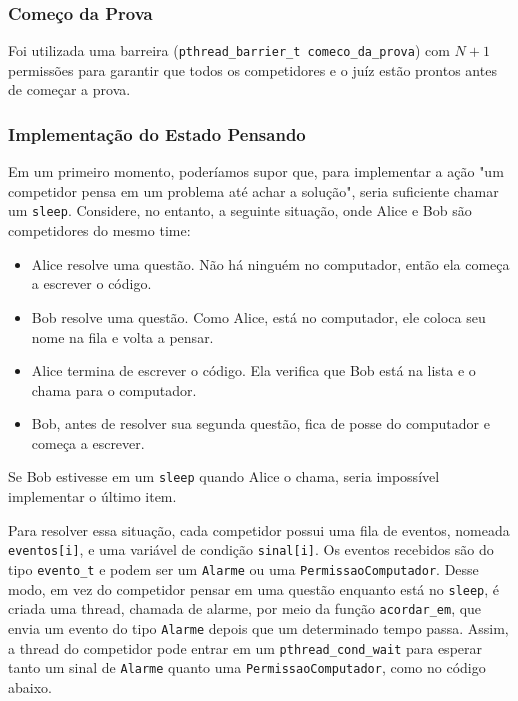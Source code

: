 \documentclass[11pt]{article}
\newcommand{\code}{\lstinline[mathescape=true]}
\begin{document}
\subsubsection{Começo da Prova}
Foi utilizada uma barreira (\code{pthread_barrier_t comeco_da_prova}) com $N + 1$ permissões para garantir que todos os competidores e o juíz
estão prontos antes de começar a prova.

\subsubsection{Implementação do Estado Pensando}
Em um primeiro momento, poderíamos supor que, para implementar a ação "um competidor pensa em um
problema até achar a solução", seria suficiente chamar um \code{sleep}. Considere, no entanto, a
seguinte situação, onde Alice e Bob são competidores do mesmo time:

\begin{itemize}
	\item Alice resolve uma questão. Não há ninguém no computador, então ela começa a escrever o
		código.
	\item Bob resolve uma questão. Como Alice, está no computador, ele coloca seu nome na fila e
		volta a pensar.
	\item Alice termina de escrever o código. Ela verifica que Bob está na lista e o chama para o
		computador.
	\item Bob, antes de resolver sua segunda questão, fica de posse do computador e começa a
		escrever.
\end{itemize}

Se Bob estivesse em um \code{sleep} quando Alice o chama, seria impossível implementar o último item.

Para resolver essa situação, cada competidor possui uma fila de eventos, nomeada \code{eventos[i]}, e
uma variável de condição \code{sinal[i]}. Os eventos recebidos são do tipo \code{evento_t} e podem
ser um \code{Alarme} ou uma \code{PermissaoComputador}. Desse modo, em vez do competidor pensar em
uma questão enquanto está no \code{sleep}, é criada uma thread, chamada de alarme, por meio da função
\code{acordar_em}, que envia um evento do tipo \code{Alarme} depois que um determinado tempo passa.
Assim, a thread do competidor pode entrar em um \code{pthread_cond_wait} para esperar tanto um sinal
de \code{Alarme} quanto uma \code{PermissaoComputador}, como no código abaixo.
\end{document}
